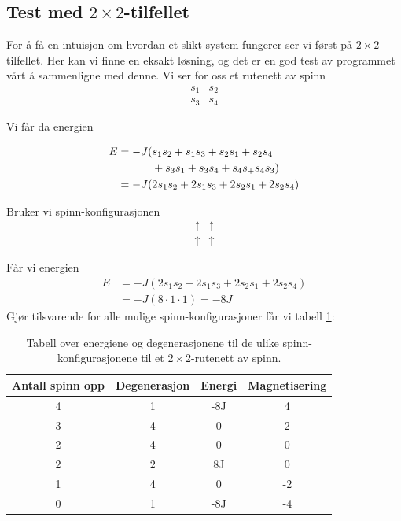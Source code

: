 \documentclass[11pt, twocolumn]{article}
\begin{document}
\subsection{Test med $2 \times 2$-tilfellet}
For å få en intuisjon om hvordan et slikt system fungerer ser vi først på 
$2 \times 2$-tilfellet. Her kan vi finne en eksakt løsning, og det er en god test
av programmet vårt å sammenligne med denne. Vi ser for oss et rutenett av spinn
\begin{align*}
s_1 & s_2 \\
s_3 & s_4  
\end{align*}

Vi får da energien

\begin{align*}
E &= -J ( s_1s_2 + s_1s_3 + s_2s_1 + s_2s_4 \\
&  \hspace{1.1cm}+ s_3s_1 + s_3s_4 + s_4s_ + s_4s_3) \\ 
&= - J  ( 2s_1s_2 + 2s_1s_3 + 2s_2s_1 + 2s_2s_4 ) 
\end{align*}

Bruker vi spinn-konfigurasjonen
\begin{align*}
\uparrow & \uparrow \\
\uparrow & \uparrow
\end{align*}

Får vi energien 
\begin{align*}
E &= - J  ( 2s_1s_2 + 2s_1s_3 + 2s_2s_1 + 2s_2s_4 ) \\&= -J ( 8 \cdot 1 \cdot 1) = -8J  
\end{align*}
Gjør tilsvarende for alle mulige spinn-konfigurasjoner får vi tabell \ref{tab:spinn-energi-deg}:


\begin{table}[ht]
\centering
\caption{Tabell over energiene og degenerasjonene til de ulike
  spinn-konfigurasjonene til et $2\times 2$-rutenett av spinn.}
\label{tab:spinn-energi-deg}
\vspace{0.5cm}
\begin{tabular}{cccc}
Antall spinn opp & Degenerasjon & Energi & Magnetisering \\
\hline
4 & 1 & -8J & 4 \\
3 & 4 & 0 & 2 \\
2 & 4 & 0 & 0 \\
2 & 2 & 8J & 0 \\
1 & 4 & 0 & -2 \\
0 & 1 & -8J & -4 \\
\hline
\end{tabular}
\end{table}
\end{document}
